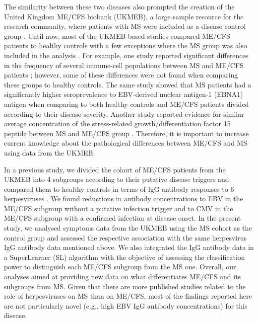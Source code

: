 The similarity between these two diseases also prompted the creation of the United Kingdom ME/CFS biobank (UKMEB), a large sample resource for the research community, where patients with MS were included as a disease control group \citep{lacerda2017UKME, lacerda2018UKME}. Until now, most of the UKMEB-based studies compared ME/CFS patients to healthy controls \citep{rodrigues2019HERVKHERVW, almenar-perez2020AssessingDiagnostic, blauensteiner2021AlteredEndothelial, bertinat2022DecreasedNO, vogl2022SystemicAntibody, gonzalez-cebrian2022DiagnosisMyalgic} with a few exceptions where the MS group was also included in the analysis \citep{jain2017PrevalenceRisk, lacerdaLogisticRegressionAnalysis2019, melvin2019CirculatingLevels, cliff2019CellularImmune}. For example, one study reported significant differences in the frequency of several immune-cell populations between MS and ME/CFS patients \citep{cliff2019CellularImmune}; however, some of these differences were not found when comparing these groups to healthy controls. The same study showed that MS patients had a significantly higher seroprevalence to EBV-derived nuclear antigen-1 (EBNA1) antigen when comparing to both healthy controls and ME/CFS patients divided according to their disease severity. Another study reported evidence for similar average concentration of the stress-related growth/differentiation factor 15 peptide between MS and ME/CFS group \citep{melvin2019CirculatingLevels}. Therefore, it is important to increase current knowledge about the pathological differences between ME/CFS and MS using data from the UKMEB.

In a previous study, we divided the cohort of ME/CFS patients from the UKMEB into 4 subgroups according to their putative disease triggers and compared them to healthy controls in terms of IgG antibody responses to 6 herpesviruses \citep{domingues2021HerpesvirusesSerologya}. We found reductions in antibody concentrations to EBV in the ME/CFS subgroup without a putative infection trigger and to CMV in the ME/CFS subgroup with a confirmed infection at disease onset. In the present study, we analysed symptoms data from the UKMEB using the MS cohort as the control group and assessed the respective association with the same herpesvirus IgG antibody data mentioned above. We also integrated the IgG antibody data in a SuperLearner (SL) algorithm with the objective of assessing the classification power to distinguish each ME/CFS subgroup from the MS one. Overall, our analyses aimed at providing new data on what differentiates ME/CFS and its subgroups from MS. Given that there are more published studies related to the role of herpesviruses on MS than on ME/CFS, most of the findings reported here are not particularly novel (e.g., high EBV IgG antibody concentrations) for this disease.

